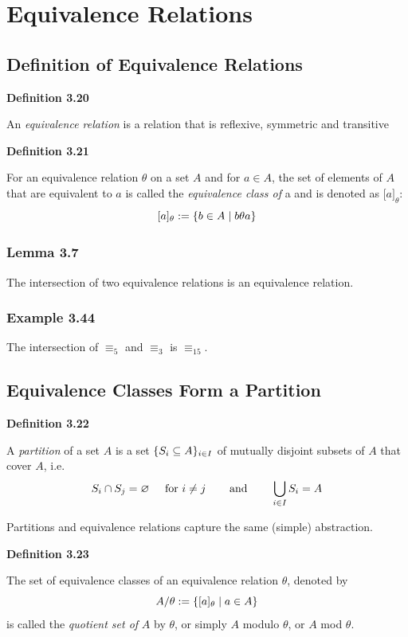 \documentclass[a4paper]{report}
\newenvironment{definition}[1]{\begin{framed}\centerline{\textbf{Definition #1}}\noindent\hspace{-1.1mm}}{\end{framed}}
\DeclarePairedDelimiter\cur{\{}{\}}
\begin{document}
\section{Equivalence Relations}
\subsection{Definition of Equivalence Relations}
\begin{definition}{3.20}
An \emph{equivalence relation} is a relation that is reflexive, symmetric and transitive 
\end{definition}

\begin{definition}{3.21}
For an equivalence relation $\theta$ on a set $A$ and for $a\in A$, the set of elements of $A$ that are equivalent to $a$ is called the \emph{equivalence class of} a and is denoted as $\lbrack a\rbrack_\theta$: \[\lbrack a\rbrack_\theta:=\cur{b\in A\mid b\theta a}\]
\end{definition}

\subsubsection*{Lemma 3.7}
The intersection of two equivalence relations is an equivalence relation.

\subsubsection*{Example 3.44}
The intersection of $\equiv_5$ and $\equiv_3$ is $\equiv_{15}$.

\subsection{Equivalence Classes Form a Partition}
\begin{definition}{3.22}
A \emph{partition} of a set $A$ is a set $\cur{S_i\subseteq A}_{i\in I}$ of mutually disjoint subsets of $A$ that cover $A$, i.e. \[S_i\cap S_j=\varnothing\hspace{5mm}\text{for }i\not= j\hspace{7.5mm}\text{and}\hspace{7.5mm}\bigcup\limits_{i\in I}S_i=A\]
\end{definition}
Partitions and equivalence relations capture the same (simple) abstraction.

\begin{definition}{3.23}
The set of equivalence classes of an equivalence relation $\theta$, denoted by \[A/\theta:=\cur{\lbrack a\rbrack_\theta\mid a\in A}\] is called the \emph{quotient set of} $A$ by $\theta$, or simply $A$ modulo $\theta$, or $A$ mod $\theta$.
\end{definition}
\end{document}
